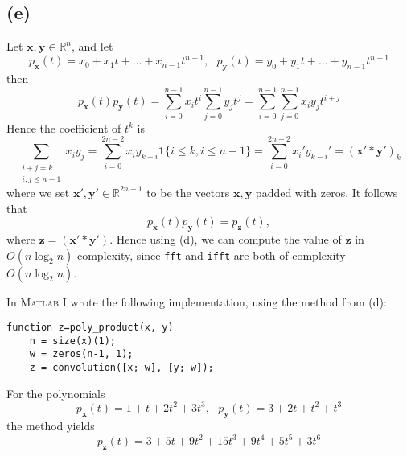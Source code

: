 \documentclass{article}
\renewcommand{\vec}{\mathbf}
\begin{document}
\subsection*{(e)}

Let $\vec{x}, \vec{y} \in \mathbb{R}^n$, and let 
\begin{equation*}
	p_{\vec{x}}(t) = x_0 + x_1t + \dots + x_{n-1}t^{n-1},~~~
	p_{\vec{y}}(t) = y_0 + y_1t + \dots + y_{n-1}t^{n-1}
\end{equation*}
then
\begin{equation*}
	p_{\vec{x}}(t)p_{\vec{y}}(t)
	= \sum_{i=0}^{n-1}x_it^i\sum_{j=0}^{n-1}y_jt^j
	= \sum_{i=0}^{n-1}\sum_{j=0}^{n-1}x_iy_jt^{i+j}
\end{equation*}
Hence the coefficient of $t^k$ is
\begin{equation*}
	\sum_{\substack{i+j=k \\ i,j \leq n-1}}x_iy_j
	= \sum_{i = 0}^{2n-2}x_iy_{k-i}
	\mathbf{1}\{i \leq k, i\leq n-1\}
	= \sum_{i = 0}^{2n - 2}x_i'y_{k-i}'
	= (\vec{x'}*\vec{y'})_k
\end{equation*}
where we set $\vec{x'}, \vec{y'} \in \mathbb{R}^{2n-1}$
to be the vectors $\vec{x},\vec{y}$ padded with zeros.
It follows that
\begin{equation*}
	p_{\vec{x}}(t)p_{\vec{y}}(t) = p_{\vec{z}}(t),
\end{equation*}
where $\vec{z} = (\vec{x'} * \vec{y'})$.
Hence using (d), we can compute the value of $\vec{z}$ in
$O(n\log_2 n)$ complexity, since \texttt{fft} and
\texttt{ifft} are both of complexity $O(n\log_2 n)$.

In \textsc{Matlab} I wrote the following implementation, using
the method from (d):
\begin{Verbatim}[frame=single,
	label=\textsc{Matlab} code - poly\_product.m]
function z=poly_product(x, y)
	n = size(x)(1);
	w = zeros(n-1, 1);
	z = convolution([x; w], [y; w]);
\end{Verbatim}
For the polynomials
\begin{equation*}
	p_{\vec{x}}(t) = 1 + t + 2t^2 + 3t^3,~~~
	p_{\vec{y}}(t) = 3 + 2t + t^2 + t^3
\end{equation*}
the method yields
\begin{equation*}
	p_{\vec{z}}(t) = 3 + 5t + 9t^2 + 15t^3 + 9t^4 + 5t^5 + 3t^6
\end{equation*}
\end{document}
